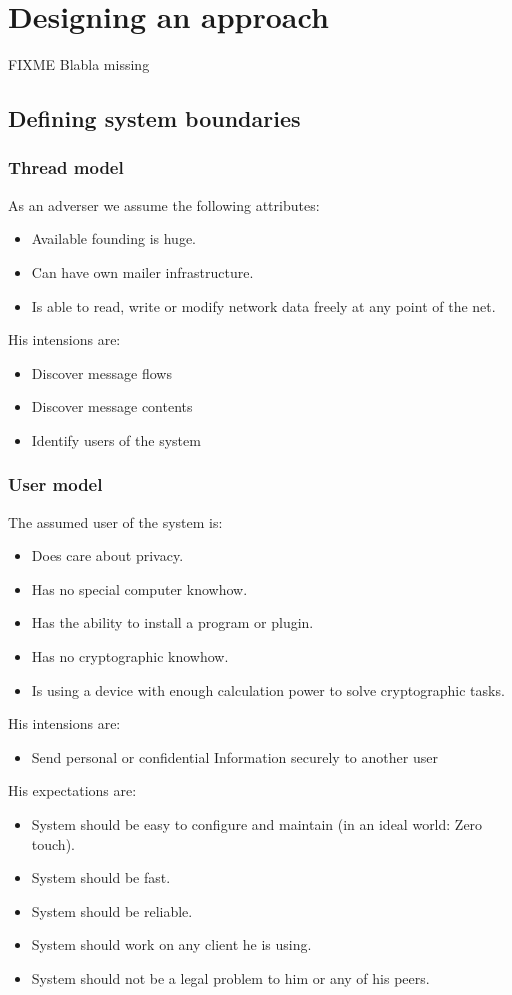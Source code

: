 \chapter{Designing an approach}
FIXME Blabla missing


\section{Defining system boundaries}
\subsection{Thread model}
As an adverser we assume the following attributes:
\begin{itemize}
\item Available founding is huge.
\item Can have own mailer infrastructure.
\item Is able to read, write or modify network data freely at any point of the net.
\end{itemize}
His intensions are:
\begin{itemize}
\item Discover message flows
\item Discover message contents
\item Identify users of the system
\end{itemize}

\subsection{User model}
The assumed user of the system is:
\begin{itemize}
\item Does care about privacy.
\item Has no special computer knowhow.
\item Has the ability to install a program or plugin.
\item Has no cryptographic knowhow.
\item Is using a device with enough calculation power to solve cryptographic tasks.
\end{itemize}
His intensions are:
\begin{itemize}
\item Send personal or confidential Information securely to another user
\end{itemize}
His expectations are:
\begin{itemize}
\item System should be easy to configure and maintain (in an ideal world: Zero touch). 
\item System should be fast.
\item System should be reliable.
\item System should work on any client he is using.
\item System should not be a legal problem to him or any of his peers.
\end{itemize}

